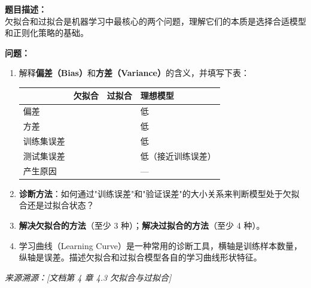 \documentclass[a4paper,11pt]{ctexart}
\begin{document}
\begin{problembox}
    \textbf{题目描述：}\\
    欠拟合和过拟合是机器学习中最核心的两个问题，理解它们的本质是选择合适模型和正则化策略的基础。

    \vspace{0.3cm}
    \textbf{问题：}
    \begin{enumerate}[(1)]
        \item 解释\textbf{偏差（Bias）}和\textbf{方差（Variance）}的含义，并填写下表：

        \begin{center}
        \begin{tabular}{p{2.5cm} p{3cm} p{3cm} p{3.5cm}}
            \toprule
            & 欠拟合 & 过拟合 & 理想模型 \\
            \midrule
            偏差 & \underline{\hspace{2.5cm}} & \underline{\hspace{2.5cm}} & 低 \\
            方差 & \underline{\hspace{2.5cm}} & \underline{\hspace{2.5cm}} & 低 \\
            训练集误差 & \underline{\hspace{2.5cm}} & \underline{\hspace{2.5cm}} & 低 \\
            测试集误差 & \underline{\hspace{2.5cm}} & \underline{\hspace{2.5cm}} & 低（接近训练误差）\\
            产生原因 & \underline{\hspace{2.5cm}} & \underline{\hspace{2.5cm}} & — \\
            \bottomrule
        \end{tabular}
        \end{center}

        \item \textbf{诊断方法}：如何通过"训练误差"和"验证误差"的大小关系来判断模型处于欠拟合还是过拟合状态？

        \item \textbf{解决欠拟合的方法}（至少 3 种）；\textbf{解决过拟合的方法}（至少 4 种）。

        \item 学习曲线（Learning Curve）是一种常用的诊断工具，横轴是训练样本数量，纵轴是误差。描述欠拟合和过拟合模型各自的学习曲线形状特征。
    \end{enumerate}
    {\color{gray}\small\textit{来源溯源：[文档第 4 章 4.3 欠拟合与过拟合]}}
\end{problembox}
\end{document}
